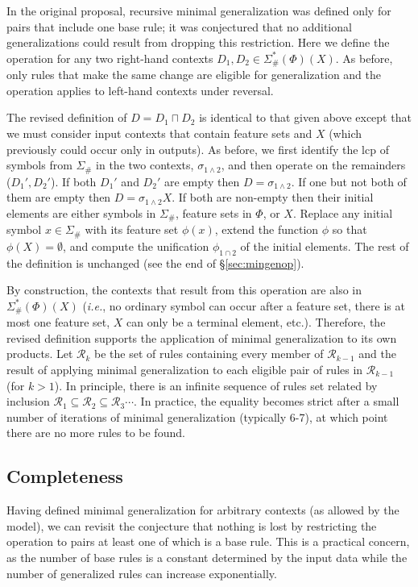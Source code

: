 \documentclass[11pt]{article}
\begin{document}
In the original proposal, recursive minimal generalization was defined only for pairs that include one base rule; it was conjectured that no additional generalizations could result from dropping this restriction. Here we define the operation for any two right-hand contexts $D_1, D_2 \in \Sigma_{\#}^*(\Phi)(X)$. As before, only rules that make the same change are eligible for generalization and the operation applies to left-hand contexts under reversal.

The revised definition of $D = D_1 \sqcap D_2$ is identical to that given above except that we must consider input contexts that contain feature sets and $X$ (which previously could occur only in outputs). As before, we first identify the lcp of symbols from $\Sigma_{\#}$ in the two contexts, $\sigma_{1\land 2}$, and then operate on the remainders ($D_1', D_2'$). If both $D_1'$ and $D_2'$ are empty then $D = \sigma_{1\land2}$. If one but not both of them are empty then $D = \sigma_{1\land2}X$. If both are non-empty then their initial elements are either symbols in $\Sigma_{\#}$, feature sets in $\Phi$, or $X$. Replace any initial symbol $x \in \Sigma_{\#}$ with its feature set $\phi(x)$, extend the function $\phi$ so that $\phi(X) = \emptyset$, and compute the unification $\phi_{1\cap2}$ of the initial elements. The rest of the definition is unchanged (see the end of \S\ref{sec:mingenop}). 

By construction, the contexts that result from this operation are also in $\Sigma_{\#}^*(\Phi)(X)$ (\emph{i.e.}, no ordinary symbol can occur after a feature set, there is at most one feature set, $X$ can only be a terminal element, etc.). Therefore, the revised definition supports the application of minimal generalization to its own products. Let $\mathcal{R}_{k}$ be the set of rules containing every member of $\mathcal{R}_{k-1}$ and the result of applying minimal generalization to each eligible pair of rules in $\mathcal{R}_{k-1}$ (for $k > 1$). In principle, there is an infinite sequence of rules set related by inclusion $\mathcal{R}_1 \subseteq \mathcal{R}_2 \subseteq \mathcal{R}_3 \cdots$. In practice, the equality becomes strict after a small number of iterations of minimal generalization (typically 6-7), at which point there are no more rules to be found.

\subsection{Completeness}

Having defined minimal generalization for arbitrary contexts (as allowed by the model), we can revisit the conjecture that nothing is lost by restricting the operation to pairs at least one of which is a base rule. This is a practical concern, as the number of base rules is a constant determined by the input data while the number of generalized rules can increase exponentially.
\end{document}
